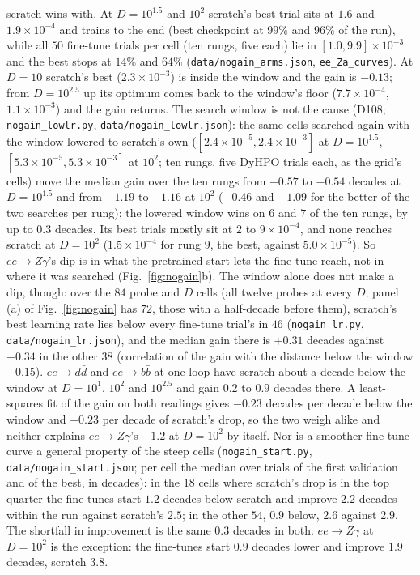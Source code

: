 \documentclass[11pt]{article}
\newcommand{\code}[1]{\texttt{#1}}
\begin{document}
scratch wins with. At $D=10^{1.5}$ and $10^2$ scratch's best trial sits at $1.6$ and $1.9\times10^{-4}$ and trains to the
end (best checkpoint at $99\%$ and $96\%$ of the run), while all $50$ fine-tune trials per cell (ten rungs, five each) lie
in $[1.0, 9.9]\times10^{-3}$ and the best stops at $14\%$ and $64\%$ (\code{data/nogain\_arms.json}, \code{ee\_Za\_curves}).
At $D=10$ scratch's best ($2.3\times10^{-3}$) is inside the window and the gain is $-0.13$; from $D=10^{2.5}$ up its
optimum comes back to the window's floor ($7.7\times10^{-4}$, $1.1\times10^{-3}$) and the gain returns. The search window is not the cause (D108; \code{nogain\_lowlr.py}, \code{data/nogain\_lowlr.json}): the same
cells searched again with the window lowered to scratch's own ($[2.4\times10^{-5}, 2.4\times10^{-3}]$ at $D=10^{1.5}$,
$[5.3\times10^{-5}, 5.3\times10^{-3}]$ at $10^2$; ten rungs, five DyHPO trials each, as the grid's cells) move the
median gain over the ten rungs from $-0.57$ to $-0.54$ decades at $D=10^{1.5}$ and from $-1.19$ to $-1.16$ at $10^2$
($-0.46$ and $-1.09$ for the better of the two searches per rung); the lowered window wins on $6$ and $7$ of the ten
rungs, by up to $0.3$ decades. Its best trials mostly sit at $2$ to $9\times10^{-4}$, and none reaches scratch at
$D=10^2$ ($1.5\times10^{-4}$ for rung $9$, the best, against $5.0\times10^{-5}$). So $ee\to Z\gamma$'s dip is in what
the pretrained start lets the fine-tune reach, not in where it was searched (Fig.~\ref{fig:nogain}b). The window alone does not make a dip, though: over the $84$ probe and $D$ cells (all twelve probes at every $D$; panel (a) of
Fig.~\ref{fig:nogain} has $72$, those with a half-decade before them),
scratch's best learning rate lies below every fine-tune trial's in $46$ (\code{nogain\_lr.py}, \code{data/nogain\_lr.json}),
and the median gain there is $+0.31$ decades against $+0.34$ in the other $38$ (correlation of the gain with the distance
below the window $-0.15$). $ee\to d\bar d$ and $ee\to b\bar b$ at one loop have scratch about a decade below the window at
$D=10^{1}$, $10^{2}$ and $10^{2.5}$ and gain $0.2$ to $0.9$ decades there. A least-squares fit of the gain on both readings gives
$-0.23$ decades per decade below the window and $-0.23$ per decade of scratch's drop, so the two weigh alike and neither
explains $ee\to Z\gamma$'s $-1.2$ at $D=10^2$ by itself. Nor is a smoother fine-tune curve a general property of the steep cells
(\code{nogain\_start.py}, \code{data/nogain\_start.json}; per cell the median over trials of the first validation and
of the best, in decades): in the $18$ cells where scratch's drop is in the top quarter the fine-tunes start $1.2$ decades
below scratch and improve $2.2$ decades within the run against scratch's $2.5$; in the other $54$, $0.9$ below, $2.6$
against $2.9$. The shortfall in improvement is the same $0.3$ decades in both. $ee\to Z\gamma$ at $D=10^2$ is the
exception: the fine-tunes start $0.9$ decades lower and improve $1.9$ decades, scratch $3.8$.
\end{document}
